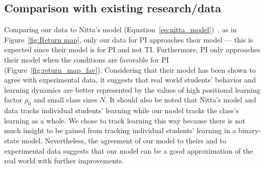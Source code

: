 \documentclass[twocolumn,secnumarabic,amssymb, nobibnotes, aps, prd]{revtex4-2}
\begin{document}
    \subsection{Comparison with existing research/data}
        
        Comparing our data to Nitta's model (Equation~\ref{eq:nitta_model})~\cite{nitta2019mathematical}, as in Figure~\ref{fig:Return map}, only our data for PI approaches their model --- this is expected since their model is for PI and not TI.
        Furthermore, PI only approaches their model when the conditions are favorable for PI (Figure~\ref{fig:return_map_fav}).
        Considering that their model has been shown to agree with experimental data, it suggests that real world students' behavior and learning dynamics are better represented by the values of high positional learning factor $\rho_0$ and small class sizes $N$.
        It should also be noted that Nitta's model and data tracks individual students' learning while our model tracks the class's learning as a whole.
        We chose to track learning this way because there is not much insight to be gained from tracking individual students' learning in a binary-state model.
        Nevertheless, the agreement of our model to theirs and to experimental data suggests that our model can be a good approximation of the real world with further improvements.
\end{document}
